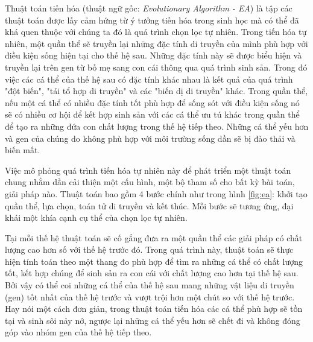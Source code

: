 Thuật toán tiến hóa (thuật ngữ gốc: \emph{Evolutionary Algorithm - EA})\cite{jansen2015analyzing} là tập các thuật toán được lấy cảm hứng từ ý tưởng tiến hóa \cite{darwin1859on} trong sinh học mà có thể đã khá quen thuộc với chúng ta đó là quá trình chọn lọc tự nhiên. Trong tiến hóa tự nhiên, một quần thể sẽ truyền lại những đặc tính di truyền của mình phù hợp với điều kiện sống hiện tại cho thế hệ sau. Những đặc tính này sẽ được biểu hiện và truyền lại trên gen từ bố mẹ sang con cái thông qua quá trình sinh sản. Trong đó việc các cá thể của thế hệ sau có đặc tính khác nhau là kết quả của quá trình "đột biến", "tái tổ hợp di truyền" và các "biến dị di truyền" khác. Trong quần thể, nếu một cá thể có nhiều đặc tính tốt phù hợp để sống sót với điều kiện sống nó sẽ có nhiều cơ hội để kết hợp sinh sản với các cá thể ưu tú khác trong quần thể để tạo ra những đứa con chất lượng trong thế hệ tiếp theo. Những cá thể yếu hơn và gen của chúng do không phù hợp với môi trường sống dần sẽ bị đào thải và biến mất. 

Việc mô phỏng quá trình tiến hóa tự nhiên này để phát triển một thuật toán chung nhằm dần cải thiện một cấu hình, một bộ tham số cho bất kỳ bài toán, giải pháp nào. Thuật toán bao gồm 4 bước chính như trong hình \ref{fig:ea}: khởi tạo quần thể, lựa chọn, toán tử di truyền và kết thúc. Mỗi bước sẽ tương ứng, đại khái một khía cạnh cụ thể của chọn lọc tự nhiên.


Tại mỗi thế hệ thuật toán sẽ cố gắng đưa ra một quần thể các giải pháp có chất lượng cao hơn số với thế hệ trước đó. Trong quá trình này, thuật toán sẽ thực hiện tính toán theo một thang đo phù hợp để tìm ra những cá thể có chất lượng tốt, kết hợp chúng để sinh sản ra con cái với chất lượng cao hơn tại thế hệ sau. Bởi vậy có thể coi những cá thể của thế hệ sau mang những vật liệu di truyền (gen) tốt nhất của thế hệ trước và vượt trội hơn một chút so với thế hệ trước. Hay nói một cách đơn giản, trong thuật toán tiến hóa các cá thể phù hợp sẽ tồn tại và sinh sôi nảy nở, ngược lại những cá thể yếu hơn sẽ chết đi và không đóng góp vào nhóm gen của thế hệ tiếp theo.



